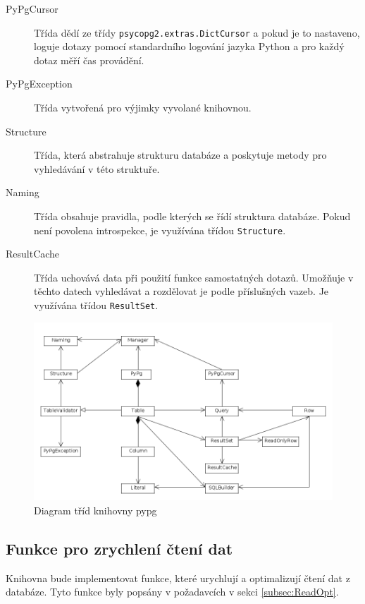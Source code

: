\documentclass[ing,male,java,dept456]{diploma}						%
\begin{document}
\begin{description}
\item[PyPgCursor] Třída dědí ze třídy \lstinline[style=inlinepython]|psycopg2.extras.DictCursor| a pokud je to nastaveno, loguje dotazy pomocí standardního logování jazyka Python a pro každý dotaz měří čas provádění.
\item[PyPgException] Třída vytvořená pro výjimky vyvolané knihovnou.
\item[Structure] Třída, která abstrahuje strukturu databáze a poskytuje metody pro vyhledávání v této struktuře. 
\item[Naming] Třída obsahuje pravidla, podle kterých se řídí struktura databáze. Pokud není povolena introspekce, je využívána třídou \lstinline[style=inlinepython]|Structure|.
\item[ResultCache] Třída uchovává data při použití funkce samostatných dotazů. Umožňuje v těchto datech vyhledávat a rozdělovat je podle příslušných vazeb. Je využívána třídou \lstinline[style=inlinepython]|ResultSet|.
\end{description}

\begin{figure}[h!]
    \centering
    \includegraphics[width=150mm]{architektura.png}
    \caption{Diagram tříd knihovny pypg}
    \label{fig:Clsdiag}
\end{figure}

\subsection{Funkce pro zrychlení čtení dat}
\label{subsec:PyPgOpt}

Knihovna bude implementovat funkce, které urychlují a optimalizují čtení dat z databáze. Tyto funkce byly popsány v požadavcích v sekci \ref{subsec:ReadOpt}.
\end{document}
